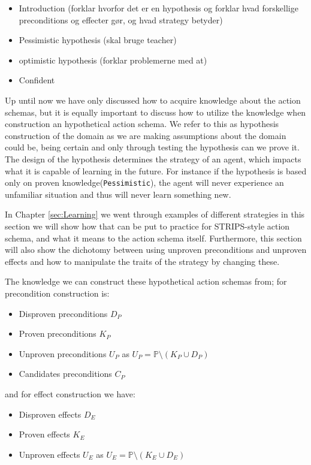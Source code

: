 \documentclass[../Master.tex]{subfiles}
\begin{document}
\begin{itemize}
	\item Introduction (forklar hvorfor det er en hypothesis og forklar hvad forskellige preconditions og effecter gør, og hvad strategy betyder)
	\item Pessimistic hypothesis (skal bruge teacher)
	\item optimistic hypothesis (forklar problemerne med at)
	\item Confident
\end{itemize}

	Up until now we have only discussed how to acquire knowledge about the action schemas, but it is equally important to discuss how to utilize the knowledge when construction an hypothetical action schema.
	We refer to this as hypothesis construction of the domain as we are making assumptions about the domain could be, being certain and only through testing the hypothesis can we prove it.
	The design of the hypothesis determines the strategy of an agent, which impacts what it is capable of learning in the future.
	For instance if the hypothesis is based only on proven knowledge(\texttt{Pessimistic}), the agent will never experience an unfamiliar situation and thus will never learn something new.

	In Chapter \ref{sec:Learning} we went through examples of different strategies in this section we will show how that can be put to practice for STRIPS-style action schema, and what it means to the action schema itself.
	Furthermore, this section will also show the dichotomy between using unproven preconditions and unproven effects and how to manipulate the traits of the strategy by changing these.

	The knowledge we can construct these hypothetical action schemas from; for precondition construction is:

	\begin{itemize}
		\item Disproven preconditions $D_P$
		\item Proven preconditions $K_P$
		\item Unproven preconditions $U_P$ as $U_P = \mathbb{P} \setminus (K_P \cup D_P)$
		\item Candidates preconditions $C_P$
	\end{itemize}

	and for effect construction we have:

	\begin{itemize}
		\item Disproven effects $D_E$
		\item Proven effects $K_E$
		\item Unproven effects $U_E$ as $U_E = \mathbb{P} \setminus (K_E \cup D_E)$
	\end{itemize}
\end{document}
